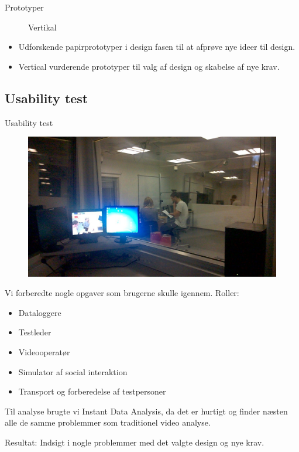 \begin{frame}{Prototyper}
\begin{multicols}{2}
\begin{figure}
			\caption{Vertikal}
		\end{figure}
	\end{multicols}
	\begin{itemize}
	\item Udforskende papirprototyper i design fasen til at afprøve nye ideer til design.
	\item Vertical vurderende prototyper til valg af design og skabelse af nye krav.
	\end{itemize}
\end{frame}
\subsection{Usability test}
\begin{frame}{Usability test}
	\begin{multicols}{2}
		\begin{figure}
			\centering
			\includegraphics[width=\textwidth/2]{slides/Heider/subjectRoom}
		\end{figure}
		\columnbreak
		Vi forberedte nogle opgaver som brugerne skulle igennem.
		Roller:
		\begin{itemize}
			\item Dataloggere
			\item Testleder
			\item Videooperatør
			\item Simulator af social interaktion
			\item Transport og forberedelse af testpersoner
		\end{itemize}
	\end{multicols}
	Til analyse brugte vi Instant Data Analysis, da det er hurtigt og finder næsten alle de samme problemmer som traditionel video analyse.

	Resultat: Indsigt i nogle problemmer med det valgte design og nye krav.
\end{frame}
